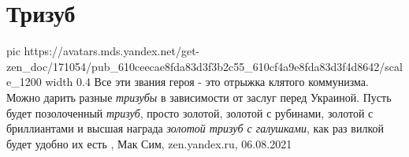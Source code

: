  
 
 
 
 
\chapter{Тризуб}
\label{sec:slova.trizub}

\ifcmt
  pic https://avatars.mds.yandex.net/get-zen_doc/171054/pub_610ceecae8fda83d3f3b2c55_610cf4a9e8fda83d3f4d8642/scale_1200
  width 0.4
\fi
Все эти звания героя - это отрыжка клятого коммунизма. Можно дарить разные
\emph{тризубы} в зависимости от заслуг перед Украиной. Пусть будет позолоченный
\emph{тризуб}, просто золотой, золотой с рубинами, золотой с бриллиантами и высшая
награда \emph{золотой тризуб с галушками}, как раз вилкой будет удобно их есть
, 
Мак Сим, zen.yandex.ru, 06.08.2021
